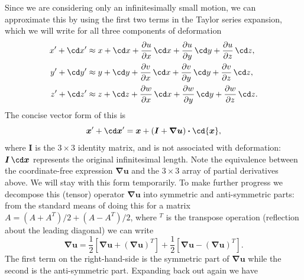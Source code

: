 \documentclass[twoside,11pt]		{report}
\begin{document}
Since we are considering only an infinitesimally small motion, we can
approximate this by using the first two terms in the Taylor series
expansion, which we will write for all three components of deformation
\begin{align*}
x^\prime + \cd x^\prime & \approx x +\cd x +
 \frac{\partial u}{\partial x}\,\cd x +
 \frac{\partial u}{\partial y}\,\cd y +
 \frac{\partial u}{\partial z}\,\cd z,\\
y^\prime + \cd y^\prime & \approx y +\cd y +
 \frac{\partial v}{\partial x}\,\cd x +
 \frac{\partial v}{\partial y}\,\cd y +
 \frac{\partial v}{\partial z}\,\cd z,\\
z^\prime + \cd z^\prime & \approx z +\cd z +
 \frac{\partial w}{\partial x}\,\cd x +
 \frac{\partial w}{\partial y}\,\cd y +
 \frac{\partial w}{\partial z}\,\cd z.
\end{align*}
The concise vector form of this is
\[
\bm{x}^\prime + \cd\bm{x}^\prime=
\bm{x}+(\bm{I}+\bm{\nabla u})\bm{\cdot}\cd{\bm{x}},
\]
where $\bm{I}$ is the $3\times3$ identity matrix, and is not
associated with deformation: $\bm{I}\,\cd\bm{x}$ represents the
original infinitesimal length. Note the equivalence between the
coordinate-free expression $\bm{\nabla u}$ and the $3\times3$ array of
partial derivatives above. We will stay with this form temporarily. To
make further progress we decompose this (tensor) operator $\bm{\nabla
u}$ into symmetric and anti-symmetric parts: from the standard means
of doing this for a matrix $A=(A+A^T)/2+(A-A^T)/2$, where $^T$ is the
transpose operation (reflection about the leading diagonal) we can
write
\[
\bm{\nabla u} =
 \frac{1}{2}\left[\bm{\nabla u}+(\bm{\nabla u})^T\right]+
 \frac{1}{2}\left[\bm{\nabla u}-(\bm{\nabla u})^T\right].
\]
The first term on the right-hand-side is the symmetric part of
$\bm{\nabla u}$ while the second is the anti-symmetric part. Expanding
back out again we have 
\end{document}
